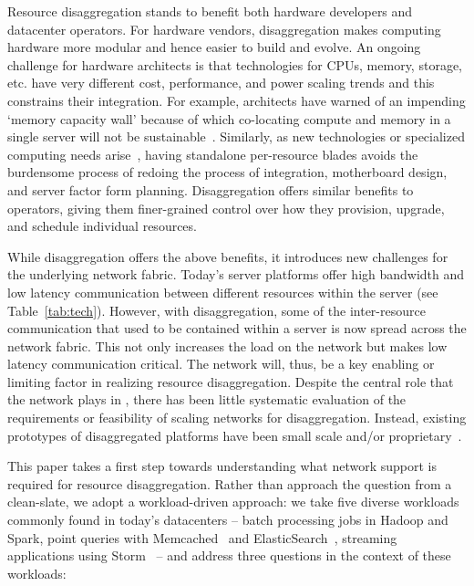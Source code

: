 Resource disaggregation stands to benefit both hardware developers and datacenter operators. %
For hardware vendors, disaggregation makes computing hardware more modular and hence 
easier to build and evolve. 
An ongoing challenge for hardware architects is that technologies for CPUs, memory, storage, etc. have very different cost, performance, and power scaling trends and this constrains their integration. For example, architects have warned of an impending `memory capacity wall' because of which co-locating compute and memory in a single server will not be sustainable~\cite{ddcHwDesign1}. 
Similarly, as new technologies or specialized computing needs arise~\cite{memristors,nvram,reg-ex-hardware,gpus}, having standalone per-resource blades avoids the burdensome process of redoing the process of integration, motherboard design, and server factor form planning. Disaggregation offers similar benefits to operators, giving them finer-grained control over how they  provision, upgrade, and schedule individual resources.

While disaggregation offers the above benefits, it introduces new challenges for the underlying network fabric. Today's server platforms offer high bandwidth and low latency communication between different resources within the server (see Table~\ref{tab:tech}). However, with disaggregation, some of the inter-resource communication that used to be contained within a server is now spread across the network fabric. This not only increases the load on the network but makes low latency communication critical. The network will, thus, be a key enabling or limiting factor in realizing resource disaggregation. 
Despite the central role that the network plays in \dis, there has been little systematic evaluation of the requirements or feasibility of scaling networks for disaggregation. Instead, existing prototypes of disaggregated platforms have been small scale and/or proprietary~\cite{rsa, hptm, fdr, seamicro}. 

This paper takes a first step towards understanding what network support is required for resource disaggregation. 
Rather than approach the question from a clean-slate, we adopt a workload-driven approach: we take five diverse workloads commonly found in today's datacenters -- batch processing jobs in Hadoop and Spark, point queries with Memcached~\cite{memcached} and ElasticSearch~\cite{elastic}, streaming applications using Storm~\cite{storm} -- and address three questions in the context of these workloads: 

